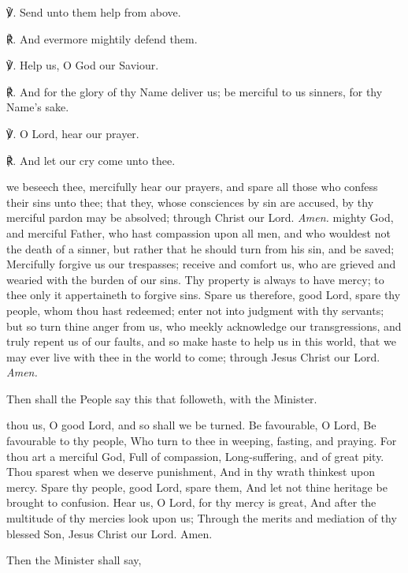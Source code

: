     ℣. Send unto them help from above.

    ℟. And evermore mightily defend them.

    ℣. Help us, O God our Saviour.

    ℟. And for the glory of thy Name deliver us; be merciful to us sinners, for thy Name's sake.
    
    ℣. O Lord, hear our prayer.
    
    ℟. And let our cry come unto thee.

{} we beseech thee, mercifully hear our prayers, and spare all those who confess their sins unto thee; that they, whose consciences by sin are accused, by thy merciful pardon may be absolved; through Christ our Lord. \textit{Amen.}
 mighty God, and merciful Father, who hast compassion upon all men, and who wouldest not the death of a sinner, but rather that he should turn from his sin, and be saved; Mercifully forgive us our trespasses; receive and comfort us, who are grieved and wearied with the burden of our sins. Thy property is always to have mercy; to thee only it appertaineth to forgive sins. Spare us therefore, good Lord, spare thy people, whom thou hast redeemed; enter not into judgment with thy servants; but so turn thine anger from us, who meekly acknowledge our transgressions, and truly repent us of our faults, and so make haste to help us in this world, that we may ever live with thee in the world to come; through Jesus Christ our Lord. \textit{Amen.}

\begin{rubric}
    Then shall the People say this that followeth, with the Minister.
\end{rubric}

 thou us, O good Lord, and so shall we be turned. Be favourable, O Lord, Be favourable to thy people, Who turn to thee in weeping, fasting, and praying. For thou art a merciful God, Full of compassion, Long-suffering, and of great pity. Thou sparest when we deserve punishment, And in thy wrath thinkest upon mercy. Spare thy people, good Lord, spare them, And let not thine heritage be brought to confusion. Hear us, O Lord, for thy mercy is great, And after the multitude of thy mercies look upon us; Through the merits and mediation of thy blessed Son, Jesus Christ our Lord. Amen.

\begin{rubric}
    Then the Minister shall say,
\end{rubric}

